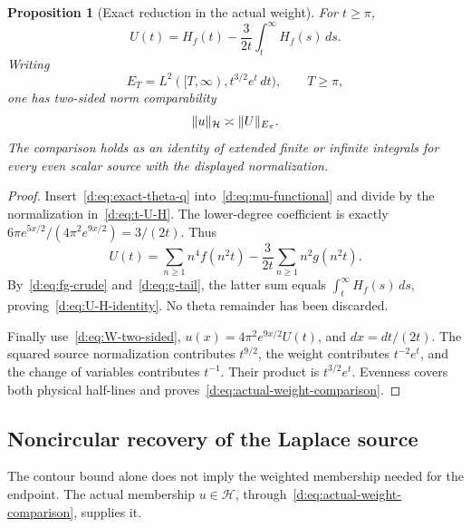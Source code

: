 \documentclass[11pt,a4paper]{article}
\numberwithin{equation}{section}
\newtheorem{proposition}[theorem]{Proposition}
\theoremstyle{definition}\newtheorem{definition}[theorem]{Definition}
\theoremstyle{remark}\newtheorem{remark}[theorem]{Remark}
\newcommand{\Hh}{\mathcal H}\newcommand{\Hw}{\mathcal H}
\begin{document}
\begin{proposition}[Exact reduction in the actual weight]\label{d:prop:exact-reduction}
For $t\ge\pi$,
\begin{equation}\label{d:eq:U-H-identity}
 U(t)=H_f(t)-\frac3{2t}\int_t^\infty H_f(s)\,ds.
\end{equation}
Writing
\begin{equation}\label{d:eq:E-tail}
 E_T=L^2([T,\infty),t^{3/2}e^t\,dt),\qquad T\ge\pi,
\end{equation}
one has two-sided norm comparability
\begin{equation}\label{d:eq:actual-weight-comparison}
 \norm{u}_{\Hh}\asymp\norm{U}_{E_\pi}.
\end{equation}
The comparison holds as an identity of extended finite or infinite integrals for every even scalar source with the displayed normalization.
\end{proposition}
\begin{proof}
Insert~\eqref{d:eq:exact-theta-q} into~\eqref{d:eq:mu-functional} and divide by the normalization in~\eqref{d:eq:t-U-H}. The lower-degree coefficient is exactly
$6\pi e^{5x/2}/(4\pi^2e^{9x/2})=3/(2t)$. Thus
\[
 U(t)=\sum_{n\ge1}n^4f(n^2t)
       -\frac3{2t}\sum_{n\ge1}n^2g(n^2t).
\]
By~\eqref{d:eq:fg-crude} and~\eqref{d:eq:g-tail}, the latter sum equals
$\int_t^\infty H_f(s)\,ds$, proving~\eqref{d:eq:U-H-identity}. No theta remainder has been discarded.

Finally use~\eqref{d:eq:W-two-sided}, $u(x)=4\pi^2e^{9x/2}U(t)$, and $dx=dt/(2t)$. The squared source normalization contributes $t^{9/2}$, the weight contributes $t^{-2}e^t$, and the change of variables contributes $t^{-1}$. Their product is $t^{3/2}e^t$. Evenness covers both physical half-lines and proves~\eqref{d:eq:actual-weight-comparison}.
\end{proof}

\subsection{Noncircular recovery of the Laplace source}\label{d:sec:source-recovery}

The contour bound alone does not imply the weighted membership needed for the endpoint. The actual membership $u\in\Hh$, through~\eqref{d:eq:actual-weight-comparison}, supplies it.
\end{document}
